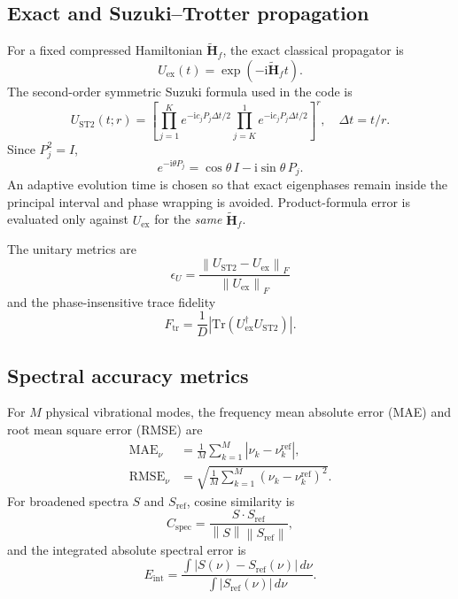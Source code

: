\documentclass[aip,jcp,reprint,amsmath,amssymb,floatfix]{revtex4-2}
\newcommand{\Hf}{\widetilde{\mathbf{H}}_{f}}
\newcommand{\Tr}{\mathrm{Tr}}
\newcommand{\norm}[1]{\left\lVert #1 \right\rVert}
\newcommand{\ii}{\mathrm{i}}
\begin{document}
\subsection{Exact and Suzuki--Trotter propagation}
For a fixed compressed Hamiltonian $\Hf$, the exact classical propagator is
\begin{equation}
U_{\mathrm{ex}}(t)=\exp(-\ii\Hf t).
\label{eq:exactprop}
\end{equation}
The second-order symmetric Suzuki formula used in the code is\cite{Trotter1959,Suzuki1976}
\begin{equation}
U_{\mathrm{ST2}}(t;r)=
\left[
\prod_{j=1}^{K}e^{-\ii c_jP_j\Delta t/2}
\prod_{j=K}^{1}e^{-\ii c_jP_j\Delta t/2}
\right]^r,
\quad \Delta t=t/r.
\label{eq:st2}
\end{equation}
Since $P_j^2=I$,
\begin{equation}
e^{-\ii\theta P_j}=\cos\theta\,I-\ii\sin\theta\,P_j.
\label{eq:pauliexp}
\end{equation}
An adaptive evolution time is chosen so that exact eigenphases remain inside the principal interval and phase wrapping is avoided. Product-formula error is evaluated only against $U_{\mathrm{ex}}$ for the \emph{same} $\Hf$.

The unitary metrics are
\begin{equation}
\epsilon_U=\frac{\norm{U_{\mathrm{ST2}}-U_{\mathrm{ex}}}_F}
{\norm{U_{\mathrm{ex}}}_F}
\end{equation}
and the phase-insensitive trace fidelity
\begin{equation}
F_{\mathrm{tr}}=\frac{1}{D}
\left|\Tr\left(U_{\mathrm{ex}}^{\dagger}U_{\mathrm{ST2}}\right)\right|.
\label{eq:tracefid}
\end{equation}

\subsection{Spectral accuracy metrics}
For $M$ physical vibrational modes, the frequency mean absolute error (MAE) and root mean square error (RMSE) are
\begin{align}
\mathrm{MAE}_{\nu}&=\frac{1}{M}\sum_{k=1}^{M}|\nu_k-\nu_k^{\mathrm{ref}}|,\\
\mathrm{RMSE}_{\nu}&=\sqrt{\frac{1}{M}\sum_{k=1}^{M}(\nu_k-\nu_k^{\mathrm{ref}})^2}.
\end{align}
For broadened spectra $S$ and $S_{\mathrm{ref}}$, cosine similarity is
\begin{equation}
C_{\mathrm{spec}}=
\frac{S\cdot S_{\mathrm{ref}}}{\norm{S}\norm{S_{\mathrm{ref}}}},
\label{eq:cosine}
\end{equation}
and the integrated absolute spectral error is
\begin{equation}
E_{\mathrm{int}}=
\frac{\int|S(\nu)-S_{\mathrm{ref}}(\nu)|\,d\nu}
{\int|S_{\mathrm{ref}}(\nu)|\,d\nu}.
\label{eq:integrated}
\end{equation}
\end{document}
